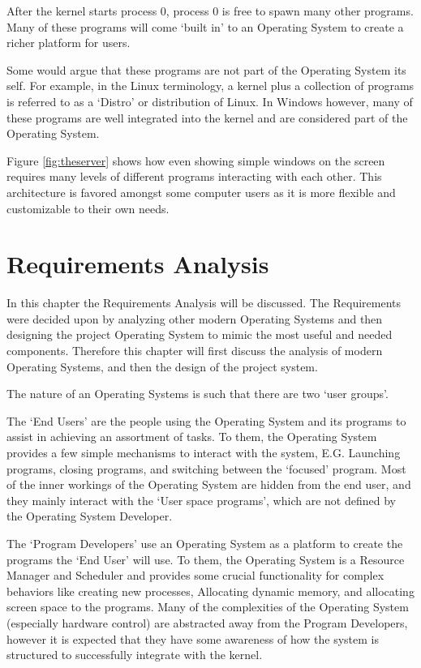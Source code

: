 \documentclass[a4paper]{report}
\begin{document}
After the kernel starts process 0, process 0 is free to spawn many other programs. Many of these programs will come `built in' to an Operating System to create a richer platform for users.

Some would argue that these programs are not part of the Operating System its self. For example, in the Linux terminology, a kernel plus a collection of programs is referred to as a `Distro' or distribution of Linux. In Windows however, many of these programs are well integrated into the kernel and are considered part of the Operating System.

Figure \ref{fig:theserver} shows how even showing simple windows on the screen requires many levels of different programs interacting with each other. This architecture is favored amongst some computer users as it is more flexible and customizable to their own needs.

\chapter*{Requirements Analysis}

In this chapter the Requirements Analysis will be discussed. The Requirements were decided upon by analyzing other modern Operating Systems and then designing the project Operating System to mimic the most useful and needed components. Therefore this chapter will first discuss the analysis of modern Operating Systems, and then the design of the project system.


The nature of an Operating Systems is such that there are two `user groups'.


The `End Users' are the people using the Operating System and its programs to assist in achieving an assortment of tasks. To them, the Operating System provides a few simple mechanisms to interact with the system, E.G. Launching programs, closing programs, and switching between the `focused' program. Most of the inner workings of the Operating System are hidden from the end user, and they mainly interact with the `User space programs', which are not defined by the Operating System Developer.


The `Program Developers' use an Operating System as a platform to create the programs the `End User' will use. To them, the Operating System is a Resource Manager and Scheduler and provides some crucial functionality for complex behaviors like creating new processes, Allocating dynamic memory, and allocating screen space to the programs. Many of the complexities of the Operating System (especially hardware control) are abstracted away from the Program Developers, however it is expected that they have some awareness of how the system is structured to successfully integrate with the kernel.
\end{document}
